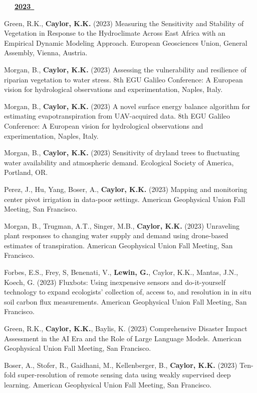 \begin{etaremune}
\vspace{0.1in}
\mbox{\ \ \ \underline{\textbf{2023 }}}
\vspace{0.1in}

\item Green, R.K., \textbf{ Caylor, K.K.} (2023) Measuring the Sensitivity and Stability of Vegetation in Response to the Hydroclimate Across East Africa with an Empirical Dynamic Modeling Approach. European Geosciences Union, General Assembly, Vienna, Austria.
\item Morgan, B., \textbf{ Caylor, K.K.} (2023) Assessing the vulnerability and resilience of riparian vegetation to water stress. 8th EGU Galileo Conference: A European vision for hydrological observations and experimentation, Naples, Italy.
\item Morgan, B., \textbf{ Caylor, K.K.} (2023) A novel surface energy balance algorithm for estimating evapotranspiration from UAV-acquired data. 8th EGU Galileo Conference: A European vision for hydrological observations and experimentation, Naples, Italy.
\item Morgan, B., \textbf{ Caylor, K.K.} (2023) Sensitivity of dryland trees to fluctuating water availability and atmospheric demand. Ecological Society of America, Portland, OR.
\item Perez, J., Hu, Yang, Boser, A., \textbf{ Caylor, K.K.} (2023) Mapping and monitoring center pivot irrigation in data-poor settings. American Geophysical Union Fall Meeting, San Francisco.
\item Morgan, B., Trugman, A.T., Singer, M.B., \textbf{ Caylor, K.K.} (2023) Unraveling plant responses to changing water supply and demand using drone-based estimates of transpiration. American Geophysical Union Fall Meeting, San Francisco.
\item Forbes, E.S., Frey, S, Benenati, V., \textbf{ Lewin, G.}, Caylor, K.K., Mantas, J.N., Koech, G. (2023) Fluxbots: Using inexpensive sensors and do-it-yourself technology to expand ecologists' collection of, access to, and resolution in in situ soil carbon flux measurements. American Geophysical Union Fall Meeting, San Francisco.
\item Green, R.K., \textbf{ Caylor, K.K.}, Baylis, K. (2023) Comprehensive Disaster Impact Assessment in the AI Era and the Role of Large Language Models. American Geophysical Union Fall Meeting, San Francisco.
\item Boser, A., Stofer, R., Gaidhani, M., Kellenberger, B., \textbf{ Caylor, K.K.} (2023) Ten-fold super-resolution of remote sensing data using weakly supervised deep learning. American Geophysical Union Fall Meeting, San Francisco.


\end{etaremune}
